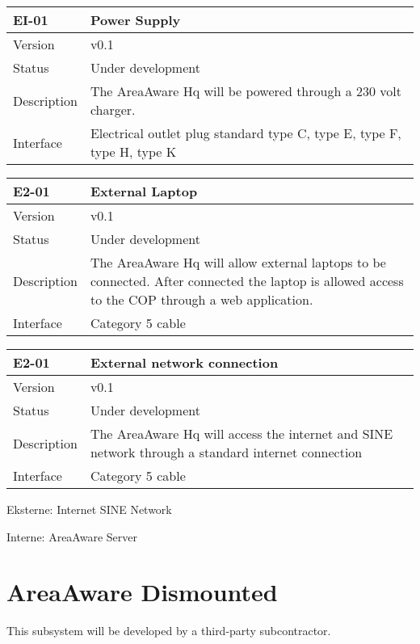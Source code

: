 \begin{longtable}{| p{3.5cm} |  p{10cm} | }
	\hline
	\textbf{EI-01} &  \textbf{Power Supply} \\
	\hline
	Version & v0.1 \\
	\hline
	Status & Under development \\
	\hline
	Description & The AreaAware Hq will be powered through a 230 volt charger.	\\
	\hline
	Interface &  Electrical outlet plug standard type C, type E,  type F,  type H, type K \\
	\hline
\end{longtable}

\begin{longtable}{| p{3.5cm} |  p{10cm} | }
	\hline
	\textbf{E2-01} &  \textbf{External Laptop} \\
	\hline
	Version & v0.1 \\
	\hline
	Status & Under development \\
	\hline
	Description & The AreaAware Hq will allow external laptops to be connected. After connected the laptop is allowed access to the COP through a web application.	\\
	\hline
	Interface & Category 5 cable \\
	\hline
\end{longtable}

\begin{longtable}{| p{3.5cm} |  p{10cm} | }
	\hline
	\textbf{E2-01} &  \textbf{External network connection} \\
	\hline
	Version & v0.1 \\
	\hline
	Status & Under development \\
	\hline
	Description & The AreaAware Hq will access the internet and SINE network through a standard internet connection	\\
	\hline
	Interface & Category 5 cable \\
	\hline
\end{longtable}



Eksterne:
Internet
SINE Network






Interne: 
AreaAware Server

\section{AreaAware Dismounted}
This subsystem will be developed by a third-party subcontractor.


